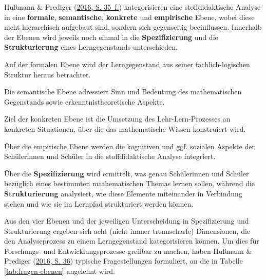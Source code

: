 \documentclass[
]{scrbook}
\theoremstyle{definition}
\theoremstyle{definition}
\theoremstyle{definition}
\theoremstyle{definition}
\theoremstyle{remark}
\begin{document}
Hußmann \& Prediger (\protect\hyperlink{ref-Hussmann:2016}{2016, S. 35~f.}) kategorisieren eine stoffdidaktische Analyse in eine \textbf{\textcolor{formalColor}{formale}}, \textbf{\textcolor{semanticColor}{semantische}}, \textbf{\textcolor{concreteColor}{konkrete}} und \textbf{\textcolor{empiricColor}{empirische}} Ebene, wobei diese nicht hierarchisch aufgebaut sind, sondern sich gegenseitig beeinflussen. Innerhalb der Ebenen wird jeweils noch einmal in die \textbf{Spezifizierung} und die \textbf{Strukturierung} eines Lerngegenstands unterschieden.

Auf der \textcolor{formalColor}{formalen Ebene} wird der Lerngegenstand aus seiner fachlich-logischen Struktur heraus betrachtet.

Die \textcolor{semanticColor}{semantische Ebene} adressiert Sinn und Bedeutung des mathematischen Gegenstands sowie erkenntnistheoretische Aspekte.

Ziel der \textcolor{concreteColor}{konkreten Ebene} ist die Umsetzung des Lehr-Lern-Prozesses an konkreten Situationen, über die das mathematische Wissen konstruiert wird.

Über die \textcolor{empiricColor}{empirische Ebene} werden die kognitiven und ggf. sozialen Aspekte der Schülerinnen und Schüler in die stoffdidaktische Analyse integriert.

Über die \textbf{Spezifizierung} wird ermittelt, was genau Schülerinnen und Schüler bezüglich eines bestimmten mathematischen Themas lernen sollen, während die \textbf{Strukturierung} analysiert, wie diese Elemente miteinander in Verbindung stehen und wie sie im Lernpfad strukturiert werden können.

Aus den vier Ebenen und der jeweiligen Unterscheidung in Spezifizierung und Strukturierung ergeben sich acht (nicht immer trennscharfe) Dimensionen, die den Analyseprozess zu einem Lerngegenstand kategorisieren können. Um dies für Forschungs- und Entwicklungsprozesse greifbar zu machen, haben Hußmann \& Prediger (\protect\hyperlink{ref-Hussmann:2016}{2016, S. 36}) typische Fragestellungen formuliert, an die in Tabelle \ref{tab:fragen-ebenen} angelehnt wird.
\end{document}
